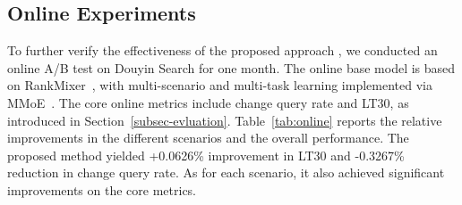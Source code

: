 \subsection{Online Experiments}
\label{exp:online}
To further verify the effectiveness of the proposed approach \modelname, we conducted an online A/B test on Douyin Search for one month.
The online base model is based on RankMixer~\cite{RankMixer}, with multi-scenario and multi-task learning implemented via MMoE~\cite{MMoE}.
The core online metrics include change query rate and LT30, as introduced in Section~\ref{subsec-evluation}.
Table~\ref{tab:online} reports the relative improvements in the different scenarios and the overall performance.
The proposed method yielded +0.0626\% improvement in LT30 and -0.3267\% reduction in change query rate.
As for each scenario, it also achieved significant improvements on the core metrics.


